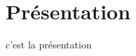 \section{Présentation}
\begin{frame}
\tableofcontents[currentsection]
\end{frame}
\begin{frame}
c'est la présentation
\end{frame}